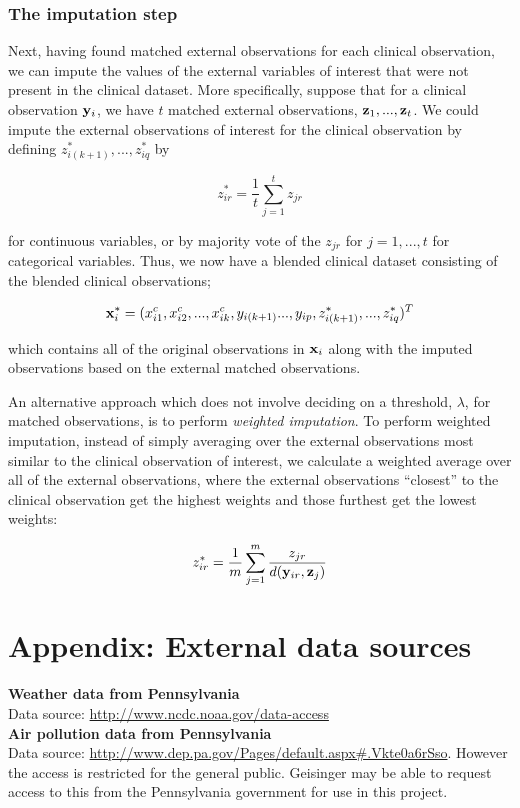 \documentclass{article}
\begin{document}
\subsubsection*{The imputation step}


Next, having found matched external observations for each clinical observation, we can impute the values of the external variables of interest that were not present in the clinical dataset. More specifically, suppose that for a clinical observation ${\bf y}_i$, we have $t$ matched external observations, ${\bf z}_1, ..., {\bf z}_t$. We could impute the external observations of interest for the clinical observation by  defining $z^*_{i(k+1)}, ..., z^*_{iq}$ by

$$z^*_{ir} = \frac{1}{t} \sum_{j=1}^t z_{jr}$$

for continuous variables, or by majority vote of the $z_{jr}$ for $j = 1, ..., t$ for categorical variables. Thus, we now have a blended clinical dataset consisting of the blended clinical observations;

$${\bf x}^*_i = (x^c_{i1}, x^c_{i2}, ..., x^c_{ik}, y_{i(k+1)} ..., y_{ip}, z_{i(k+1)}^*, ..., z_{iq}^*)^T$$

which contains all of the original observations in ${\bf x}_i$ along with the imputed observations based on the external matched observations.

An alternative approach which does not involve deciding on a threshold, $\lambda$, for matched observations, is to perform \emph{weighted imputation}. To perform weighted imputation, instead of simply averaging over the external observations most similar to the clinical observation of interest, we calculate a weighted average over all of the external observations, where the external observations ``closest'' to the clinical observation get the highest weights and those furthest get the lowest weights:

$$z^*_{ir} = \frac{1}{m} \sum_{j=1}^m \frac{z_{jr}}{d({\bf y}_{ir}, {\bf z}_{j})}$$


\section*{Appendix: External data sources}


{\bf Weather data from Pennsylvania}\\
Data source: \url{http://www.ncdc.noaa.gov/data-access}\\

{\bf Air pollution data from Pennsylvania}\\
Data source: \url{http://www.dep.pa.gov/Pages/default.aspx#.Vkte0a6rSso}. However the access is restricted for the general public. Geisinger may be able to request access to this from the Pennsylvania government for use in this project.
\end{document}
